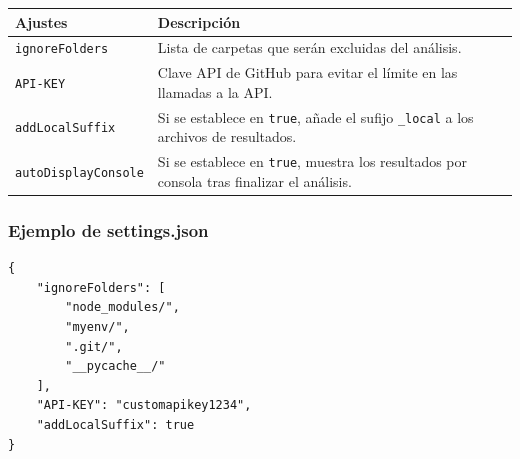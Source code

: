 \documentclass[a4paper, 12pt]{book}
\begin{document}
\begin{tabular}{|l|p{10cm}|} %
\hline
\textbf{Ajustes} & \textbf{Descripción} \\
\hline
\texttt{ignoreFolders} & Lista de carpetas que serán excluidas del análisis. \\
\texttt{API-KEY} & Clave API de GitHub para evitar el límite en las llamadas a la API. \\
\texttt{addLocalSuffix} & Si se establece en \texttt{true}, añade el sufijo \texttt{\_local} a los archivos de resultados. \\
\texttt{autoDisplayConsole} & Si se establece en \texttt{true}, muestra los resultados por consola tras finalizar el análisis. \\
\hline
\end{tabular}

\vspace{1em}
\subsubsection{Ejemplo de settings.json}
\begin{verbatim}
{
    "ignoreFolders": [
        "node_modules/",
        "myenv/",
        ".git/",
        "__pycache__/"
    ],
    "API-KEY": "customapikey1234",
    "addLocalSuffix": true
}
\end{verbatim}


\cleardoublepage


\end{document}
